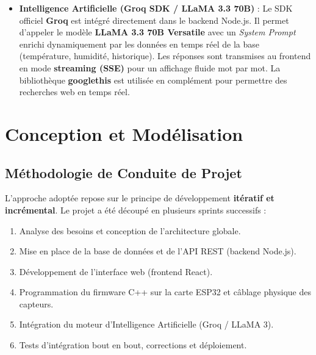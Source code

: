 \documentclass[12pt,a4paper]{report}
\begin{document}
\begin{itemize}
    \item \textbf{Intelligence Artificielle (Groq SDK / LLaMA 3.3 70B)} : Le SDK officiel \textbf{Groq} est intégré directement dans le backend Node.js. Il permet d'appeler le modèle \textbf{LLaMA 3.3 70B Versatile} avec un \textit{System Prompt} enrichi dynamiquement par les données en temps réel de la base (température, humidité, historique). Les réponses sont transmises au frontend en mode \textbf{streaming (SSE)} pour un affichage fluide mot par mot. La bibliothèque \textbf{googlethis} est utilisée en complément pour permettre des recherches web en temps réel.
\end{itemize}

\chapter{Conception et Modélisation}

\section{Méthodologie de Conduite de Projet}
L'approche adoptée repose sur le principe de développement \textbf{itératif et incrémental}. Le projet a été découpé en plusieurs sprints successifs :
\begin{enumerate}
    \item Analyse des besoins et conception de l'architecture globale.
    \item Mise en place de la base de données et de l'API REST (backend Node.js).
    \item Développement de l'interface web (frontend React).
    \item Programmation du firmware C++ sur la carte ESP32 et câblage physique des capteurs.
    \item Intégration du moteur d'Intelligence Artificielle (Groq / LLaMA 3).
    \item Tests d'intégration bout en bout, corrections et déploiement.
\end{enumerate}
\end{document}
